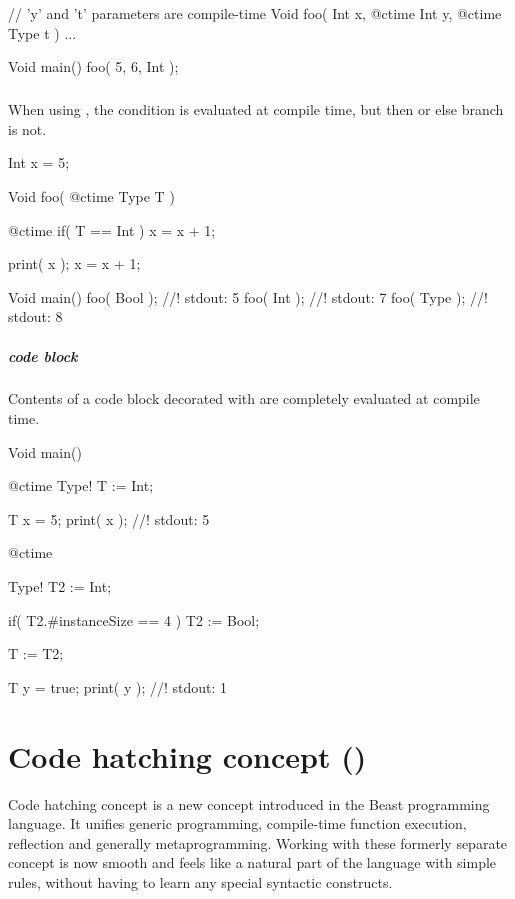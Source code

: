 \begin{code}
// 'y' and 't' parameters are compile-time
Void foo( Int x, @ctime Int y, @ctime Type t ) { ... }

Void main() {
	foo( 5, 6, Int );
}
\end{code}

\paragraph{}
When using , the condition is evaluated at compile time, but then or else branch is not.

\begin{code}
Int x = 5;

Void foo( @ctime Type T ) {	
	@ctime if( T == Int )
		x = x + 1;
	
	print( x );
	x = x + 1;
}

Void main() {
	foo( Bool ); //! stdout: 5
	foo( Int ); //! stdout: 7
	foo( Type ); //! stdout: 8
}
\end{code}

\paragraph{\ctime code block} Contents of a code block decorated with \ctime are completely evaluated at compile time. \nopagebreak

\begin{code}
Void main() {
	@ctime Type! T := Int;
	
	T x = 5;
	print( x ); //! stdout: 5
	
	@ctime {
		Type! T2 := Int;
		
		if( T2.#instanceSize == 4 )
			T2 := Bool;
		
		T := T2;
	}
	
	T y = true;
	print( y ); //! stdout: 1
}
\end{code}

\chapter{Code hatching concept ()} \label{ctime}
Code hatching concept is a new concept introduced in the Beast programming language. It unifies generic programming, compile-time function execution, reflection and generally metaprogramming. Working with these formerly separate concept is now smooth and feels like a natural part of the language with simple rules, without having to learn any special syntactic constructs.

